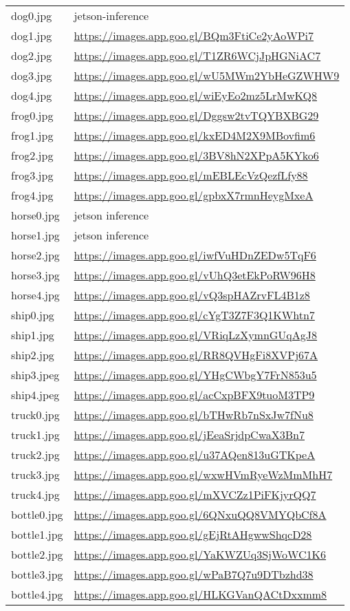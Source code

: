 \begin{longtable}{p{2cm}|p{10cm}|}
dog0.jpg& jetson-inference\\
dog1.jpg& \url{https://images.app.goo.gl/BQm3FtiCe2yAoWPi7}\\
dog2.jpg& \url{https://images.app.goo.gl/T1ZR6WCjJpHGNiAC7}\\
dog3.jpg& \url{https://images.app.goo.gl/wU5MWm2YbHeGZWHW9}\\
dog4.jpg& \url{https://images.app.goo.gl/wiEyEo2mz5LrMwKQ8}\\
frog0.jpg& \url{https://images.app.goo.gl/Dggsw2tvTQYBXBG29}\\
frog1.jpg& \url{https://images.app.goo.gl/kxED4M2X9MBovfim6}\\
frog2.jpg& \url{https://images.app.goo.gl/3BV8hN2XPpA5KYko6}\\
frog3.jpg& \url{https://images.app.goo.gl/mEBLEcVzQezfLfy88}\\
frog4.jpg& \url{https://images.app.goo.gl/gpbxX7rmnHeygMxeA}\\
horse0.jpg& jetson inference\\
horse1.jpg& jetson inference\\
horse2.jpg& \url{https://images.app.goo.gl/iwfVuHDnZEDw5TqF6}\\
horse3.jpg& \url{https://images.app.goo.gl/vUhQ3etEkPoRW96H8}\\
horse4.jpg& \url{https://images.app.goo.gl/vQ3spHAZrvFL4B1z8}\\
ship0.jpg& \url{https://images.app.goo.gl/cYgT3Z7F3Q1KWhtn7}\\
ship1.jpg& \url{https://images.app.goo.gl/VRiqLzXymnGUqAgJ8}\\
ship2.jpg& \url{https://images.app.goo.gl/RR8QVHgFi8XVPj67A}\\
ship3.jpeg& \url{https://images.app.goo.gl/YHgCWbgY7FrN853u5}\\
ship4.jpeg& \url{https://images.app.goo.gl/acCxpBFX9tuoM3TP9}\\
truck0.jpg& \url{https://images.app.goo.gl/bTHwRb7nSxJw7fNu8}\\
truck1.jpg& \url{https://images.app.goo.gl/jEeaSrjdpCwaX3Bn7}\\
truck2.jpg& \url{https://images.app.goo.gl/u37AQen813uGTKpeA}\\
truck3.jpg& \url{https://images.app.goo.gl/wxwHVmRyeWzMmMhH7}\\
truck4.jpg& \url{https://images.app.goo.gl/mXVCZz1PiFKjyrQQ7}\\
bottle0.jpg& \url{https://images.app.goo.gl/6QNxuQQ8VMYQbCf8A}\\
bottle1.jpg& \url{https://images.app.goo.gl/gEjRtAHgwwShqcD28}\\
bottle2.jpg& \url{https://images.app.goo.gl/YaKWZUq3SjWoWC1K6}\\
bottle3.jpg& \url{https://images.app.goo.gl/wPaB7Q7u9DTbzhd38}\\
bottle4.jpg& \url{https://images.app.goo.gl/HLKGVanQACtDxxmm8}\\
\end{longtable}


